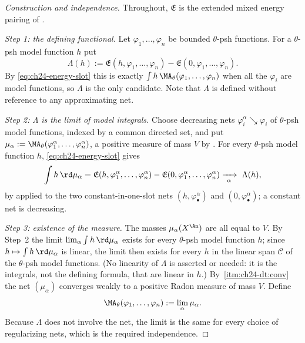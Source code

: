 \begin{proof}[Construction and independence]
Throughout, \(\mathfrak E\) is the extended mixed energy pairing of
.

\emph{Step 1: the defining functional.}  Let \(\varphi_1,\ldots,\varphi_n\)
be bounded \(\theta\)-psh functions.  For a \(\theta\)-psh model function
\(h\) put
\begin{equation}
\label{eq:ch24-lambda}
 \Lambda(h):=\mathfrak E(h,\varphi_1,\ldots,\varphi_n)
             -\mathfrak E(0,\varphi_1,\ldots,\varphi_n).
\end{equation}
By \eqref{eq:ch24-energy-slot} this is exactly
\(\int h\,\MA_\theta(\varphi_1,\ldots,\varphi_n)\) when all the
\(\varphi_i\) are model functions, so \(\Lambda\) is the only candidate.
Note that \(\Lambda\) is defined without reference to any approximating net.

\emph{Step 2: \(\Lambda\) is the limit of model integrals.}  Choose
decreasing nets \(\varphi_i^\alpha\searrow\varphi_i\) of \(\theta\)-psh
model functions, indexed by a common directed set, and put
\(\mu_\alpha:=\MA_\theta(\varphi_1^\alpha,\ldots,\varphi_n^\alpha)\), a
positive measure of mass \(V\) by .  For every
\(\theta\)-psh model function \(h\), \eqref{eq:ch24-energy-slot} gives
\[
 \int h\,\rd\mu_\alpha
 =\mathfrak E(h,\varphi^\alpha_1,\ldots,\varphi^\alpha_n)
  -\mathfrak E(0,\varphi^\alpha_1,\ldots,\varphi^\alpha_n)
 \xrightarrow[\ \alpha\ ]{}\ \Lambda(h),
\]
by  applied to the two constant-in-one-slot
nets \((h,\varphi^\alpha_\bullet)\) and \((0,\varphi^\alpha_\bullet)\); a
constant net is decreasing.

\emph{Step 3: existence of the measure.}  The masses \(\mu_\alpha(X^{\An})\)
are all equal to \(V\).  By Step~2 the limit
\(\lim_\alpha\int h\,\rd\mu_\alpha\) exists for every \(\theta\)-psh model
function \(h\); since \(h\mapsto\int h\,\rd\mu_\alpha\) is linear, the limit
then exists for every \(h\) in the linear span \(\mathcal C\) of the
\(\theta\)-psh model functions.  (No linearity of \(\Lambda\) is asserted or
needed: it is the integrals, not the defining formula, that are linear in
\(h\).)  By
\,\cref{itm:ch24-dt:conv} the net
\((\mu_\alpha)\) converges weakly to a positive Radon measure of mass
\(V\).  Define
\[
 \MA_\theta(\varphi_1,\ldots,\varphi_n):=\lim_\alpha\mu_\alpha .
\]
Because \(\Lambda\) does not involve the net, the limit is the same for
every choice of regularizing nets, which is the required independence.


\end{proof}
